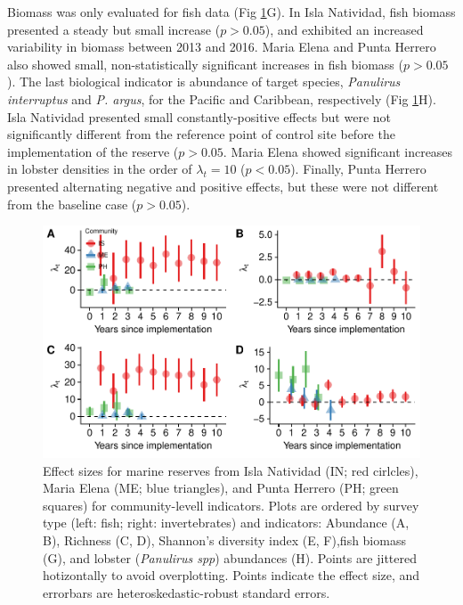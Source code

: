 \documentclass{frontiersSCNS}
\theoremstyle{definition}
\theoremstyle{definition}
\theoremstyle{definition}
\theoremstyle{remark}
\begin{document}
Biomass was only evaluated for fish data (Fig \ref{fig:indicators}G). In
Isla Natividad, fish biomass presented a steady but small increase
(\(p>0.05\)), and exhibited an increased variability in biomass between
2013 and 2016. Maria Elena and Punta Herrero also showed small,
non-statistically significant increases in fish biomass (\(p>0.05\)).
The last biological indicator is abundance of target species,
\emph{Panulirus interruptus} and \emph{P. argus}, for the Pacific and
Caribbean, respectively (Fig \ref{fig:indicators}H). Isla Natividad
presented small constantly-positive effects but were not significantly
different from the reference point of control site before the
implementation of the reserve (\(p > 0.05\). Maria Elena showed
significant increases in lobster densities in the order of
\(\lambda_t = 10\) (\(p < 0.05\)). Finally, Punta Herrero presented
alternating negative and positive effects, but these were not different
from the baseline case (\(p > 0.05\)).

\begin{figure}
\centering
\includegraphics{Villasenor-Derbez_files/figure-latex/unnamed-chunk-5-1.pdf}
\caption{\label{fig:unnamed-chunk-5}\label{fig:indicators}Effect sizes for
marine reserves from Isla Natividad (IN; red cirlcles), Maria Elena (ME;
blue triangles), and Punta Herrero (PH; green squares) for
community-levell indicators. Plots are ordered by survey type (left:
fish; right: invertebrates) and indicators: Abundance (A, B), Richness
(C, D), Shannon's diversity index (E, F),fish biomass (G), and lobster
(\emph{Panulirus spp}) abundances (H). Points are jittered hotizontally
to avoid overplotting. Points indicate the effect size, and errorbars
are heteroskedastic-robust standard errors.}
\end{figure}
\end{document}
